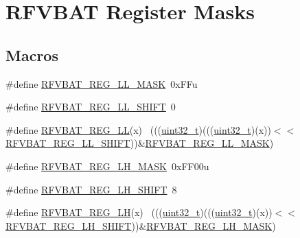 \hypertarget{group___r_f_v_b_a_t___register___masks}{}\section{R\+F\+V\+B\+AT Register Masks}
\label{group___r_f_v_b_a_t___register___masks}
\subsection*{Macros}
\begin{DoxyCompactItemize}
\item 
\#define \hyperlink{group___r_f_v_b_a_t___register___masks_gac055aaeebf0ff5200e7b3703d6a6ed73}{R\+F\+V\+B\+A\+T\+\_\+\+R\+E\+G\+\_\+\+L\+L\+\_\+\+M\+A\+SK}~0x\+F\+Fu
\item 
\#define \hyperlink{group___r_f_v_b_a_t___register___masks_ga77fdef5edef0e9e20236761366ed3fbb}{R\+F\+V\+B\+A\+T\+\_\+\+R\+E\+G\+\_\+\+L\+L\+\_\+\+S\+H\+I\+FT}~0
\item 
\#define \hyperlink{group___r_f_v_b_a_t___register___masks_ga113d3d8df5cf04d594707c9a9df4ea8c}{R\+F\+V\+B\+A\+T\+\_\+\+R\+E\+G\+\_\+\+LL}(x)                                              ~(((\hyperlink{_p_e___types_8h_a33594304e786b158f3fb30289278f5af}{uint32\+\_\+t})(((\hyperlink{_p_e___types_8h_a33594304e786b158f3fb30289278f5af}{uint32\+\_\+t})(x))$<$$<$\hyperlink{group___r_f_v_b_a_t___register___masks_ga77fdef5edef0e9e20236761366ed3fbb}{R\+F\+V\+B\+A\+T\+\_\+\+R\+E\+G\+\_\+\+L\+L\+\_\+\+S\+H\+I\+FT}))\&\hyperlink{group___r_f_v_b_a_t___register___masks_gac055aaeebf0ff5200e7b3703d6a6ed73}{R\+F\+V\+B\+A\+T\+\_\+\+R\+E\+G\+\_\+\+L\+L\+\_\+\+M\+A\+SK})
\item 
\#define \hyperlink{group___r_f_v_b_a_t___register___masks_gaac2f9a56be08c02d917e25d2160bb25d}{R\+F\+V\+B\+A\+T\+\_\+\+R\+E\+G\+\_\+\+L\+H\+\_\+\+M\+A\+SK}~0x\+F\+F00u
\item 
\#define \hyperlink{group___r_f_v_b_a_t___register___masks_ga274af8b911ddd78c1ce6df899ad83cbd}{R\+F\+V\+B\+A\+T\+\_\+\+R\+E\+G\+\_\+\+L\+H\+\_\+\+S\+H\+I\+FT}~8
\item 
\#define \hyperlink{group___r_f_v_b_a_t___register___masks_ga551abab9c745a2fdca59aa0f68abef21}{R\+F\+V\+B\+A\+T\+\_\+\+R\+E\+G\+\_\+\+LH}(x)                                              ~(((\hyperlink{_p_e___types_8h_a33594304e786b158f3fb30289278f5af}{uint32\+\_\+t})(((\hyperlink{_p_e___types_8h_a33594304e786b158f3fb30289278f5af}{uint32\+\_\+t})(x))$<$$<$\hyperlink{group___r_f_v_b_a_t___register___masks_ga274af8b911ddd78c1ce6df899ad83cbd}{R\+F\+V\+B\+A\+T\+\_\+\+R\+E\+G\+\_\+\+L\+H\+\_\+\+S\+H\+I\+FT}))\&\hyperlink{group___r_f_v_b_a_t___register___masks_gaac2f9a56be08c02d917e25d2160bb25d}{R\+F\+V\+B\+A\+T\+\_\+\+R\+E\+G\+\_\+\+L\+H\+\_\+\+M\+A\+SK})

\end{DoxyCompactItemize}
